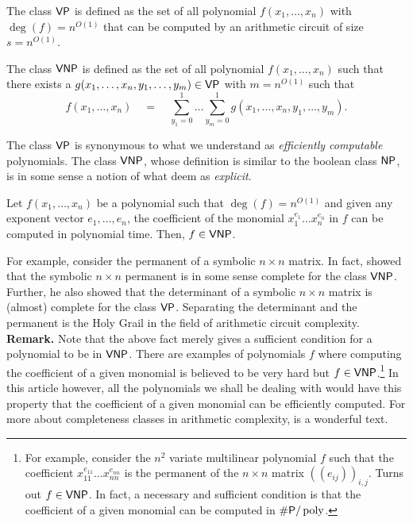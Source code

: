 \begin{definition}
The class $\mathsf{VP}$ is defined as the set of all polynomial $f(x_1,\dots, x_n)$ with $\deg(f) = n^{O(1)}$ that can be computed by an arithmetic circuit of size $s = n^{O(1)}$. 

The class $\mathsf{VNP}$ is defined as the set of all polynomial $f(x_1,\dots, x_n)$ such that there exists a $g(x_1,\dots, x_n, y_1,\dots, y_m) \in \mathsf{VP}$ with $m = n^{O(1)}$ such that
\[
f(x_1,\dots, x_n) \quad = \quad \sum_{y_1=0}^1\dots \sum_{y_m=0}^1 g(x_1,\dots, x_n, y_1,\dots, y_m).
\]
\end{definition}
The class $\mathsf{VP}$ is synonymous to what we understand as \emph{efficiently computable} polynomials. 
The class $\mathsf{VNP}$, whose definition is similar to the boolean class $\mathsf{NP}$, is in some sense a notion of what deem as \emph{explicit}. 

\begin{fact}
Let $f(x_1,\dots, x_n)$ be a polynomial such that $\deg(f) = n^{O(1)}$ and given any exponent vector $e_1,\dots, e_n$, the coefficient of the monomial $x_1^{e_1}\dots x_n^{e_n}$ in $f$ can be computed in polynomial time. 
Then, $f \in \mathsf{VNP}$. 
\end{fact}

For example, consider the permanent of a symbolic $n\times n$ matrix. 
In fact, \cite{v79} showed that the symbolic $n\times n$ permanent is in some sense complete for the class $\mathsf{VNP}$. 
Further, he also showed that the determinant of a symbolic  $n\times n$ matrix is (almost) complete for the class $\mathsf{VP}$. 
Separating the determinant and the permanent is the Holy Grail in the field of arithmetic circuit complexity. \\

{\bf Remark.} Note that the above fact merely gives a sufficient condition for a polynomial to be in $\mathsf{VNP}$. 
There are examples of polynomials $f$ where computing the coefficient of a given monomial is believed to be very hard but $f\in \mathsf{VNP}$.\footnote{For example, consider the $n^2$ variate multilinear polynomial $f$ such that the coefficient $x_{11}^{e_{11}}\dots x_{nn}^{e_{nn}}$ is the permanent of the $n\times n$ matrix $(\!(e_{ij})\!)_{i,j}$. 
Turns out $f \in \mathsf{VNP}$. 
In fact, a necessary and sufficient condition is that the coefficient of a given monomial can be computed in $\#\mathsf{P}/\operatorname{poly}$. }  In this article however, all the polynomials we shall be dealing with would have this property that the coefficient of a given monomial can be efficiently computed. 
For more about completeness classes in arithmetic complexity, \cite{bcs97} is a wonderful text. 


